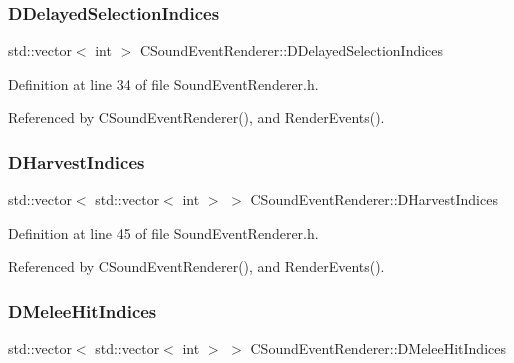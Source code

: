\subsubsection{\texorpdfstring{D\+Delayed\+Selection\+Indices}{DDelayedSelectionIndices}}
{\footnotesize\ttfamily std\+::vector$<$ int $>$ C\+Sound\+Event\+Renderer\+::\+D\+Delayed\+Selection\+Indices\hspace{0.3cm}{\ttfamily [protected]}}



Definition at line 34 of file Sound\+Event\+Renderer.\+h.



Referenced by C\+Sound\+Event\+Renderer(), and Render\+Events().

\hypertarget{classCSoundEventRenderer_abe64071cbc49cffab8a5c6160b7f821d}{}\label{classCSoundEventRenderer_abe64071cbc49cffab8a5c6160b7f821d} 
\subsubsection{\texorpdfstring{D\+Harvest\+Indices}{DHarvestIndices}}
{\footnotesize\ttfamily std\+::vector$<$ std\+::vector$<$ int $>$ $>$ C\+Sound\+Event\+Renderer\+::\+D\+Harvest\+Indices\hspace{0.3cm}{\ttfamily [protected]}}



Definition at line 45 of file Sound\+Event\+Renderer.\+h.



Referenced by C\+Sound\+Event\+Renderer(), and Render\+Events().

\hypertarget{classCSoundEventRenderer_a54a3a8f6a91adcaa81faa779772622da}{}\label{classCSoundEventRenderer_a54a3a8f6a91adcaa81faa779772622da} 
\subsubsection{\texorpdfstring{D\+Melee\+Hit\+Indices}{DMeleeHitIndices}}
{\footnotesize\ttfamily std\+::vector$<$ std\+::vector$<$ int $>$ $>$ C\+Sound\+Event\+Renderer\+::\+D\+Melee\+Hit\+Indices\hspace{0.3cm}{\ttfamily [protected]}}



